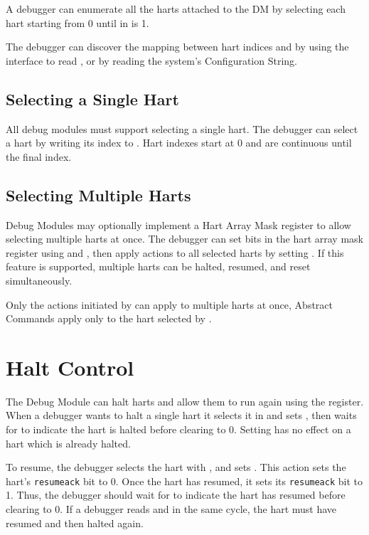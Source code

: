 A debugger can enumerate all the harts
attached to the DM by selecting each hart starting from 0
until \Fanynonexistent in \Rdmstatus is 1.

The debugger can discover the mapping between hart indices and
\Rmhartid by using the interface to read \Rmhartid, or by
reading the system's Configuration String.

\subsection {Selecting a Single Hart}

All debug modules must support selecting a single hart.
The debugger can select a hart by writing its index to \Fhartsel.
Hart indexes start at 0 and are continuous until the final index.

\subsection {Selecting Multiple Harts}

Debug Modules may optionally implement a Hart Array Mask register to allow
selecting multiple harts at once. The debugger can set bits in the hart array mask register
using \Rhawindowsel and \Rhawindow, then apply actions to all selected harts
by setting \Fhasel. If this feature is supported, multiple harts can be
halted, resumed, and reset simultaneously.

Only the actions initiated by \Rdmcontrol can apply to multiple harts
at once, Abstract Commands apply only to the hart selected by
\Fhartsel.

\section{Halt Control} \label{haltcontrol}

The Debug Module can halt harts and allow them to run again using
the \Rdmcontrol register.
When a debugger wants to halt a single hart it selects it in \Fhartsel
and sets \Fhaltreq, then waits
for \Fallhalted to indicate the hart is halted before clearing \Fhaltreq
to 0. Setting \Fhaltreq has no effect on a hart which is already halted.

To resume, the debugger selects the hart with \Fhartsel,
and sets \Fresumereq. This action sets the hart's
{\tt resumeack} bit to 0. Once the hart has resumed, it
sets its {\tt resumeack} bit to 1. Thus, the
debugger should wait for \Fallresumeack to indicate the
hart has resumed before clearing \Fresumereq to 0.
If a debugger reads \Fallresumeack
and \Fallhalted in the same cycle, the hart must have resumed
and then halted again.

